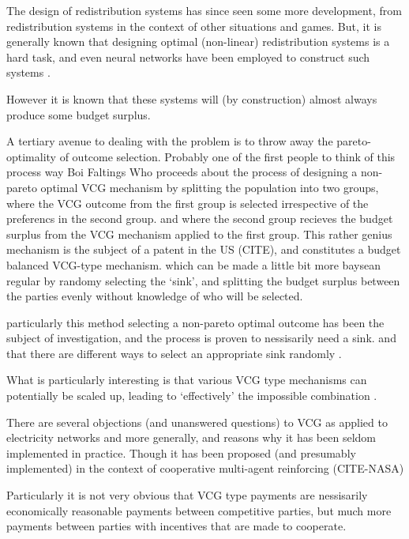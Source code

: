 The design of redistribution systems has since seen some more development, from redistribution systems in the context of other situations and games.
But, it is generally known that designing optimal (non-linear) redistribution systems is a hard task, and even neural networks have been employed to construct such systems \cite{DBLP:conf/atal/ManishaJG18}.

However it is known that these systems will (by construction) almost always produce some budget surplus.

A tertiary avenue to dealing with the problem is to throw away the pareto-optimality of outcome selection.
Probably one of the first people to think of this process way Boi Faltings \cite{10.1007/978-3-642-25510-6_14}
Who proceeds about the process of designing a non-pareto optimal VCG mechanism by splitting the population into two groups, where the VCG outcome from the first group is selected irrespective of the preferencs in the second group.
and where the second group recieves the budget surplus from the VCG mechanism applied to the first group.
This rather genius mechanism is the subject of a patent in the US (CITE), and constitutes a budget balanced VCG-type mechanism.
which can be made a little bit more baysean regular by randomy selecting the `sink', and splitting the budget surplus between the parties evenly without knowledge of who will be selected.\cite{10.1007/978-3-642-25510-6_14}

particularly this method selecting a non-pareto optimal outcome has been the subject of investigation, and the process is proven to nessisarily need a sink.
and that there are different ways to select an appropriate sink randomly \cite{NATH2019673}.

What is particularly interesting is that various VCG type mechanisms can potentially be scaled up, leading to `effectively' the impossible combination \cite{NATH2019673}.

There are several objections (and unanswered questions) to VCG as applied to electricity networks and more generally, and reasons why it has been seldom implemented in practice.\cite{journals/ior/Rothkopf07}\cite{Ausubel2006}
Though it has been proposed (and presumably implemented) in the context of cooperative multi-agent reinforcing (CITE-NASA)

Particularly it is not very obvious that VCG type payments are nessisarily economically reasonable payments between competitive parties, but much more payments between parties with incentives that are made to cooperate.

